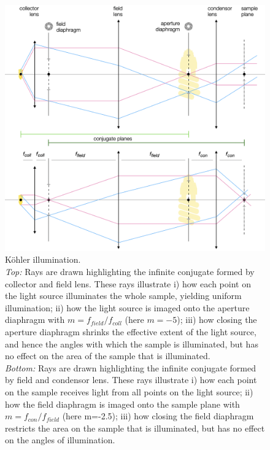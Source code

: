 \documentclass[a4paper]{report}
\begin{document}
	\begin{figure}[h]
		\center
		\includegraphics[width=1\textwidth]{figures/koehler_illumination.png}
		\captionsetup{width=0.95\textwidth}
		\caption{K\"{o}hler illumination. \\
		\emph{Top:} Rays are drawn highlighting the infinite conjugate formed by collector and field lens. These rays illustrate i) how each point on the light source illuminates the whole sample, yielding uniform illumination; ii) how the light source is imaged onto the aperture diaphragm with $m=f_{field}/f_{coll}$ (here $m=-5$); iii) how closing the aperture diaphragm shrinks the effective extent of the light source, and hence the angles with which the sample is illuminated, but has no effect on the area of the sample that is illuminated. \\
		\emph{Bottom:} Rays are drawn highlighting the infinite conjugate formed by field and condensor lens. These rays illustrate i) how each point on the sample receives light from all points on the light source; ii) how the field diaphragm is imaged onto the sample plane with $m=f_{con}/f_{field}$ (here m=-2.5); iii) how closing the field diaphragm restricts the area on the sample that is illuminated, but has no effect on the angles of illumination.}
		\label{fig:koehler_illumination}
	\end{figure}
	
	
\end{document}
